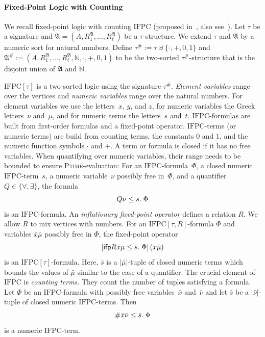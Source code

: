 \documentclass[]{lmcs}
\newcommand{\nat}{\mathbb{N}}
\newcommand{\defining}[1]{\emph{#1}}
\newcommand{\disunion}{\mathbin{\uplus}}
\newcommand{\qspace}{\mathchoice{\;}{\,}{}{}}
\newcommand{\set}[1]{\lbrace #1 \rbrace}
\newcommand{\numVarA}{\nu}
\newcommand{\numVarB}{\mu}
\newcommand{\uniVarA}{x}
\newcommand{\uniVarB}{y}
\newcommand{\uniVarC}{z}
\newcommand{\varVec}[1]{\bar{#1}}
\newcommand{\numVarVA}{\varVec{\numVarA}}
\newcommand{\numVarVB}{\varVec{\numVarB}}
\newcommand{\uniVarVA}{\varVec{\uniVarA}}
\newcommand{\termA}{s}
\newcommand{\termB}{t}
\newcommand{\formA}{\Phi}
\newcommand{\rel}{R}
\newcommand{\tup}[1]{\bar{#1}}
\newcommand{\Struct}{\mathfrak{A}}
\newcommand{\StructV}{A}
\newcommand{\countingExt}[1]{#1^{\#}}
\newcommand{\sig}{\tau}
\newcommand{\PTime}{\textsc{Ptime}}
\newcommand{\IFPC}{\ensuremath{\mathrm{IFPC}}}
\newcommand{\ifp}{\mathsf{ifp}}
\begin{document}
\paragraph{Fixed-Point Logic with Counting}

\newcommand{\eval}[2]{#2^{#1}}
We recall fixed-point logic with counting \IFPC{} (proposed in~\cite{Immerman87b}, also see~\cite{Otto1997}).
Let $\sig$ be a signature
and $\Struct = (\StructV, \rel_1^\Struct, \dots, \rel_\ell^\Struct)$ be a $\sig$\nobreakdash-structure.
We extend $\sig$ and $\Struct$ by a numeric sort for natural numbers.
Define $\countingExt{\sig} := \sig \disunion \{\cdot, +, 0,1\}$
and
$\countingExt{\Struct} := (\StructV, \rel_1^\Struct, \dots, \rel_\ell^\Struct, \nat, \cdot, +, 0, 1)$
to be the two-sorted $\countingExt{\sig}$\nobreakdash-structure
that is the disjoint union of $\Struct$ and $\nat$.

$\IFPC{}[\sig]$ is a two-sorted logic using the signature $\countingExt{\sig}$.
\defining{Element variables} range over the vertices and \defining{numeric variables} range over the natural numbers.
For element variables we use the letters~$\uniVarA$, $\uniVarB$, and $\uniVarC$,
for numeric variables the Greek letters~$\numVarA$ and~$\numVarB$,
and for numeric terms the letters~$\termA$ and~$\termB$.
\IFPC{}-formulas are built from first-order formulas and a fixed-point operator.
\IFPC{}-terms (or numeric terms) are build from counting terms, the constants $0$ and $1$, and the numeric function symbols $\cdot$ and $+$.
A term or formula is closed if it has no free variables.
When quantifying over numeric variables,
their range needs to be bounded to ensure \PTime{}-evaluation:
For an \IFPC{}-formula~$\formA$,
a closed numeric \IFPC{}-term~$\termA$,
a numeric variable~$\numVarA$ possibly free in~$\formA$,
and a quantifier $Q \in\set{\forall, \exists}$,  the formula
\[Q \numVarA \leq \termA.\qspace\formA\]
is an \IFPC{}-formula.
An \defining{inflationary fixed-point operator} defines a relation $\rel$.
We allow $\rel$ to mix vertices with numbers.
For an $\IFPC{}[\sig,\rel]$-formula $\formA$
and variables $\uniVarVA\numVarVB$ possibly free in $\formA$,
the fixed-point operator
\[\left[\ifp \rel \uniVarVA\numVarVB \leq \tup{\termA}.\qspace\formA \right](\uniVarVA\numVarVB)\]
is an $\IFPC{}[\sig]$-formula. Here, $\tup{\termA}$ is a  $|\numVarVB|$-tuple of closed numeric terms which bounds the values of $\numVarVB$
similar to the case of a quantifier.
The crucial element of \IFPC{} is \defining{counting terms}.
They count the number of tuples satisfying a formula.
Let $\formA$ be an \IFPC{}-formula
with possibly free variables~$\uniVarVA$ and~$\numVarVA$
and let $\tup{\termA}$ be a $|\numVarVA|$-tuple of closed  numeric \IFPC{}-terms. Then
\[ \#\uniVarVA\numVarVA \leq \tup{\termA}.\qspace\formA \]
is a numeric \IFPC{}-term.
\end{document}
